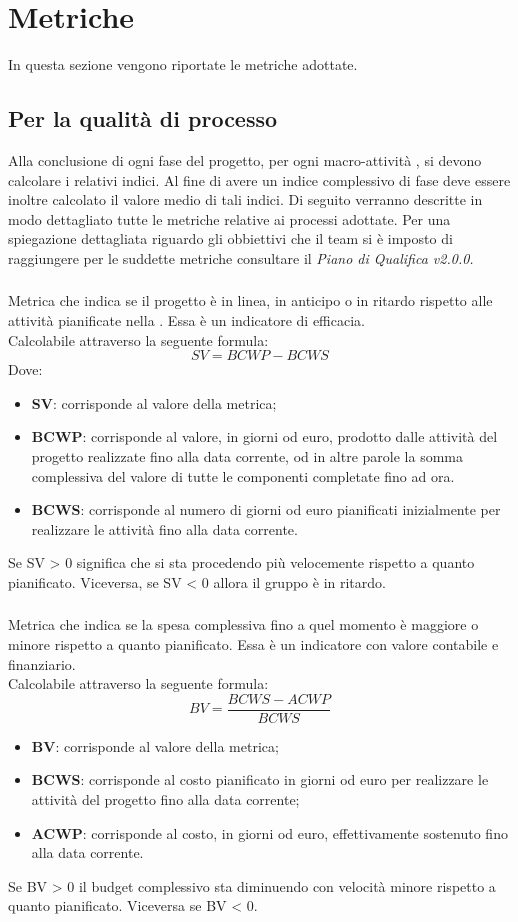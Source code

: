 \section{Metriche}
In questa sezione vengono riportate le metriche adottate.
\subsection{Per la qualità di processo}
Alla conclusione di ogni fase del progetto, per ogni macro-attività , si devono calcolare i relativi indici. Al fine di avere un indice complessivo di fase deve essere inoltre calcolato il valore medio di tali indici. Di seguito verranno descritte in modo dettagliato tutte le metriche relative ai processi adottate. Per una spiegazione dettagliata riguardo gli obbiettivi che il team si è imposto di raggiungere per le suddette metriche consultare il \emph{Piano di Qualifica v2.0.0.}
\subsubsection{}
Metrica che indica se il progetto è in linea, in anticipo o in ritardo rispetto alle attività pianificate nella . Essa è un indicatore di efficacia. \\
Calcolabile attraverso la seguente formula:
\[ SV=BCWP-BCWS\]
Dove:
\begin{itemize}
	\item {\textbf{SV}: corrisponde al valore della metrica;}
	\item {\textbf{BCWP}: corrisponde al valore, in giorni od euro, prodotto dalle attività del progetto realizzate fino alla data corrente, od in altre parole la somma complessiva del valore di tutte le componenti completate fino ad ora.}
	\item {\textbf{BCWS}: corrisponde al numero di giorni od euro pianificati inizialmente per realizzare le attività fino alla data corrente.}
\end{itemize}
Se SV > 0 significa che si sta procedendo più velocemente rispetto a quanto pianificato. Viceversa, se SV < 0 allora il gruppo è in ritardo.
\subsubsection{}
Metrica che indica se la spesa complessiva fino a quel momento è maggiore o minore rispetto a quanto pianificato. Essa è un indicatore con valore contabile e finanziario. \\
Calcolabile attraverso la seguente formula:
\[BV=\frac{BCWS-ACWP}{BCWS}\]
\begin{itemize}
	\item {\textbf{BV}: corrisponde al valore della metrica;}
	\item {\textbf{BCWS}: corrisponde al costo pianificato in giorni od euro per realizzare le attività del progetto fino alla data corrente;}
	\item {\textbf{ACWP}: corrisponde al costo, in giorni od euro, effettivamente sostenuto fino alla data corrente.}
\end{itemize}
Se BV > 0 il budget complessivo sta diminuendo con velocità minore rispetto a quanto pianificato. Viceversa se BV < 0.

